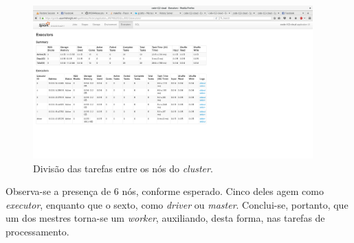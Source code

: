 \documentclass[12pt, a4paper]{article}
\begin{document}
\begin{figure}[h!] 
    \centering
    \includegraphics[width=0.96\textwidth]{img/1000/nodes}
    \caption{Divisão das tarefas entre os nós do \textit{cluster}.}        
    \label{fig:nodes}
\end{figure}

Observa-se a presença de 6 nós, conforme esperado. Cinco deles agem como
\textit{executor}, enquanto que o sexto, como \textit{driver} ou
\textit{master}. Conclui-se, portanto, que um dos mestres torna-se um
\textit{worker}, auxiliando, desta forma, nas tarefas de processamento.
\end{document}
